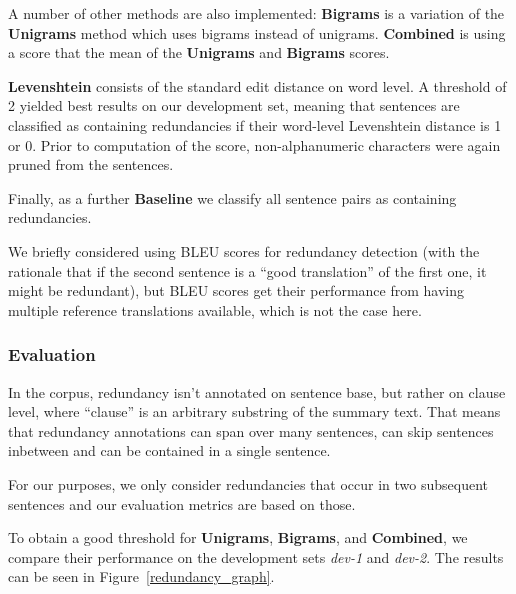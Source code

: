 \documentclass[a4paper,10pt]{scrartcl}
\theoremstyle{style}
\begin{document}
A number of other methods are also implemented: \textbf{Bigrams} is a variation of the \textbf{Unigrams} method which uses bigrams instead of unigrams. \textbf{Combined} is using a score that the mean of the \textbf{Unigrams} and \textbf{Bigrams} scores.

\textbf{Levenshtein} consists of the standard edit distance \citep{levenshtein1966binary} on word level. A threshold of 2 yielded best results on our development set, meaning that sentences are classified as containing redundancies if their word-level Levenshtein distance is 1 or 0. Prior to computation of the score, non-alphanumeric characters were again pruned from the sentences.

Finally, as a further \textbf{Baseline} we classify all sentence pairs as containing redundancies.

We briefly considered using BLEU scores \citep{papineni2002bleu} for redundancy detection (with the rationale that if the second sentence is a ``good translation'' of the first one, it might be redundant), but BLEU scores get their performance from having multiple reference translations available, which is not the case here.

\subsubsection{Evaluation}

In the corpus, redundancy isn't annotated on sentence base, but rather on clause level, where ``clause'' is an arbitrary substring of the summary text. That means that redundancy annotations can span over many sentences, can skip sentences inbetween and can be contained in a single sentence.

For our purposes, we only consider redundancies that occur in two subsequent sentences and our evaluation metrics are based on those.

To obtain a good threshold for \textbf{Unigrams}, \textbf{Bigrams}, and \textbf{Combined}, we compare their performance on the development sets \textit{dev-1} and \textit{dev-2}. The results can be seen in Figure~\ref{redundancy_graph}.
\end{document}
